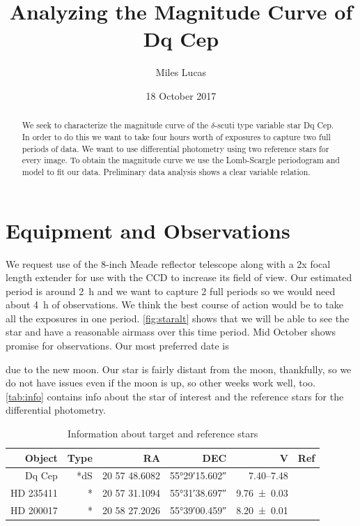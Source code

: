 \documentclass[]{article}
\title{Analyzing the Magnitude Curve of Dq Cep}
\author{Miles Lucas}
\begin{document}
\maketitle

\begin{abstract}
	We seek to characterize the magnitude curve of the $\delta$-scuti type variable star Dq Cep. In order to do this we want to take four hours worth of exposures to capture two full periods of data. We want to use differential photometry using two reference stars for every image. To obtain the magnitude curve we use the Lomb-Scargle periodogram and model to fit our data. Preliminary data analysis shows a clear variable relation.
\end{abstract}

\section{Equipment and Observations}
	We request use of the 8-inch Meade reflector telescope along with a 2x focal length extender for use with the CCD to increase its field of view. Our estimated period is around \SI{2}{\hour} and we want to capture 2 full periods so we would need about \SI{4}{\hour} of observations. We think the best course of action would be to take all the exposures in one period. \autoref{fig:staralt} shows that we will be able to see the star and have a reasonable airmass over this time period. Mid October shows promise for observations. Our most preferred date is \date{18 October 2017} due to the new moon. Our star is fairly distant from the moon, thankfully, so we do not have issues even if the moon is up, so other weeks work well, too. \autoref{tab:info} contains info about the star of interest and the reference stars for the differential photometry.
	
	\begin{table}[p]
		\centering
		\caption{Information about target and reference stars}
		\begin{tabular}{rrrrrr}
			\hline
			   Object & Type &            RA &                DEC &                      V &                        Ref \\ \hline\hline
			   Dq Cep &  *dS & 20 57 48.6082 & \ang{55;29;15.602} & \SIrange{7.40}{7.48}{} & \cite{1971GCVS3.C......0K} \\
			HD 235411 &    * & 20 57 31.1094 & \ang{55;31;38.697} &     \SI{9.76\pm0.03}{} &  \cite{2000AA...355L..27H} \\
			HD 200017 &    * & 20 58 27.2026 & \ang{55;39;00.459} &     \SI{8.20\pm0.01}{} &  \cite{2000AA...355L..27H} \\ \hline
		\end{tabular}
		\label{tab:info}
	\end{table}
	
\end{document}
